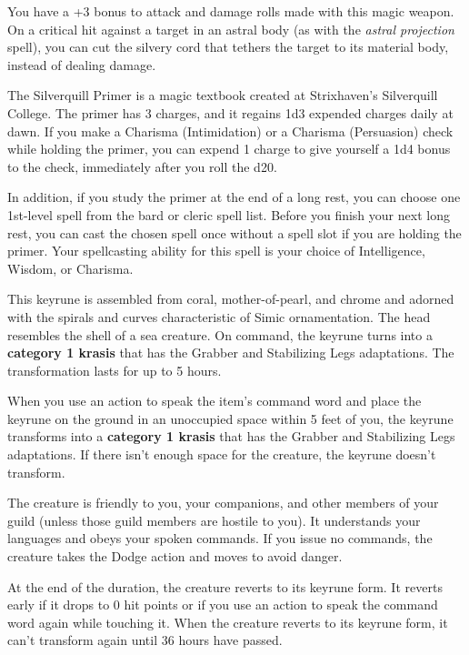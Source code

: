 \documentclass[10pt,a4paper,twoside,bg=print,twocolumn,openany,nodeprecatedcode]{dndbook}
\begin{document}
You have a +3 bonus to attack and damage rolls made with this magic weapon. On a critical hit against a target in an astral body (as with the \textit{astral projection} spell), you can cut the silvery cord that tethers the target to its material body, instead of dealing damage.

The Silverquill Primer is a magic textbook created at Strixhaven's Silverquill College. The primer has 3 charges, and it regains 1d3 expended charges daily at dawn. If you make a Charisma (Intimidation) or a Charisma (Persuasion) check while holding the primer, you can expend 1 charge to give yourself a 1d4 bonus to the check, immediately after you roll the d20.

In addition, if you study the primer at the end of a long rest, you can choose one 1st-level spell from the bard or cleric spell list. Before you finish your next long rest, you can cast the chosen spell once without a spell slot if you are holding the primer. Your spellcasting ability for this spell is your choice of Intelligence, Wisdom, or Charisma.

This keyrune is assembled from coral, mother-of-pearl, and chrome and adorned with the spirals and curves characteristic of Simic ornamentation. The head resembles the shell of a sea creature. On command, the keyrune turns into a \textbf{category 1 krasis} that has the Grabber and Stabilizing Legs adaptations. The transformation lasts for up to 5 hours.

When you use an action to speak the item's command word and place the keyrune on the ground in an unoccupied space within 5 feet of you, the keyrune transforms into a \textbf{category 1 krasis} that has the Grabber and Stabilizing Legs adaptations. If there isn't enough space for the creature, the keyrune doesn't transform.

The creature is friendly to you, your companions, and other members of your guild (unless those guild members are hostile to you). It understands your languages and obeys your spoken commands. If you issue no commands, the creature takes the Dodge action and moves to avoid danger.

At the end of the duration, the creature reverts to its keyrune form. It reverts early if it drops to 0 hit points or if you use an action to speak the command word again while touching it. When the creature reverts to its keyrune form, it can't transform again until 36 hours have passed.
\end{document}
